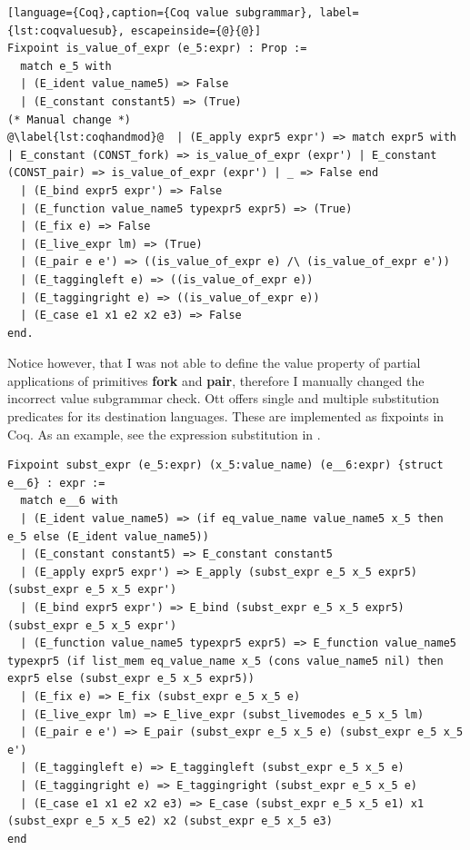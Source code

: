 \documentclass[12pt,twoside,notitlepage]{report}
\begin{document}
\begin{enumerate}
{\begin{minipage}{\linewidth}

\begin{lstlisting}[language={Coq},caption={Coq value subgrammar}, label={lst:coqvaluesub}, escapeinside={@}{@}]
Fixpoint is_value_of_expr (e_5:expr) : Prop :=
  match e_5 with
  | (E_ident value_name5) => False
  | (E_constant constant5) => (True)
(* Manual change *)
@\label{lst:coqhandmod}@  | (E_apply expr5 expr') => match expr5 with | E_constant (CONST_fork) => is_value_of_expr (expr') | E_constant (CONST_pair) => is_value_of_expr (expr') | _ => False end  
  | (E_bind expr5 expr') => False
  | (E_function value_name5 typexpr5 expr5) => (True)
  | (E_fix e) => False
  | (E_live_expr lm) => (True)
  | (E_pair e e') => ((is_value_of_expr e) /\ (is_value_of_expr e'))
  | (E_taggingleft e) => ((is_value_of_expr e))
  | (E_taggingright e) => ((is_value_of_expr e))
  | (E_case e1 x1 e2 x2 e3) => False
end.
\end{lstlisting}

\end{minipage}	
Notice however, that I was not able to define the value property of partial applications of primitives \textbf{fork} and \textbf{pair}, therefore I manually changed the incorrect value subgrammar check. Ott offers single and multiple substitution predicates for its destination languages. These are implemented as fixpoints in Coq. As an example, see the expression substitution in .
\begin{minipage}{\linewidth}

\begin{lstlisting}[language={Coq},caption={Coq expression substitution}, label={lst:coqexprsubst}]
Fixpoint subst_expr (e_5:expr) (x_5:value_name) (e__6:expr) {struct e__6} : expr :=
  match e__6 with
  | (E_ident value_name5) => (if eq_value_name value_name5 x_5 then e_5 else (E_ident value_name5))
  | (E_constant constant5) => E_constant constant5
  | (E_apply expr5 expr') => E_apply (subst_expr e_5 x_5 expr5) (subst_expr e_5 x_5 expr')
  | (E_bind expr5 expr') => E_bind (subst_expr e_5 x_5 expr5) (subst_expr e_5 x_5 expr')
  | (E_function value_name5 typexpr5 expr5) => E_function value_name5 typexpr5 (if list_mem eq_value_name x_5 (cons value_name5 nil) then expr5 else (subst_expr e_5 x_5 expr5))
  | (E_fix e) => E_fix (subst_expr e_5 x_5 e)
  | (E_live_expr lm) => E_live_expr (subst_livemodes e_5 x_5 lm)
  | (E_pair e e') => E_pair (subst_expr e_5 x_5 e) (subst_expr e_5 x_5 e')
  | (E_taggingleft e) => E_taggingleft (subst_expr e_5 x_5 e)
  | (E_taggingright e) => E_taggingright (subst_expr e_5 x_5 e)
  | (E_case e1 x1 e2 x2 e3) => E_case (subst_expr e_5 x_5 e1) x1 (subst_expr e_5 x_5 e2) x2 (subst_expr e_5 x_5 e3)
end
\end{lstlisting}


\end{minipage}}
\end{enumerate}
\end{document}
